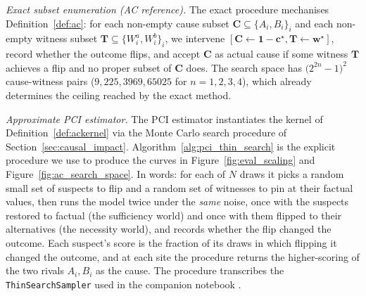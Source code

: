 \medskip\noindent\textit{Exact subset enumeration (AC reference).}
The exact procedure mechanises Definition~\ref{def:ac}: for each non-empty cause
subset $\mathbf{C}\subseteq\{A_i,B_i\}_i$ and each non-empty witness subset
$\mathbf{T}\subseteq\{W^a_i,W^b_i\}_i$, we intervene
$[\mathbf{C}\!\leftarrow\!\mathbf{1}-\mathbf{c}^\star,\mathbf{T}\!\leftarrow\!\mathbf{w}^\star]$,
record whether the outcome flips, and accept $\mathbf{C}$ as actual cause if some
witness $\mathbf{T}$ achieves a flip and no proper subset of $\mathbf{C}$ does.
The search space has $\bigl(2^{2n}-1\bigr)^2$ cause-witness pairs ($9, 225, 3969,
65025$ for $n=1,2,3,4$), which already determines the ceiling reached by the exact
method.

\medskip\noindent\textit{Approximate PCI estimator.}
The PCI estimator instantiates the kernel of Definition~\ref{def:ackernel}
via the Monte Carlo search procedure of Section~\ref{sec:causal_impact}. Algorithm~\ref{alg:pci_thin_search} is the
explicit procedure we use to produce the curves in
Figure~\ref{fig:eval_scaling} and Figure~\ref{fig:ac_search_space}.
In words: for each of $N$ draws it picks a random small set of suspects to flip and a
random set of witnesses to pin at their factual values, then runs the model twice under the
\emph{same} noise, once with the suspects restored to factual (the sufficiency world) and
once with them flipped to their alternatives (the necessity world), and records whether
the flip changed the outcome. Each suspect's score is the fraction of its draws in which
flipping it changed the outcome, and at each site the procedure returns the higher-scoring
of the two rivals $A_i, B_i$ as the cause. The procedure transcribes the \texttt{ThinSearchSampler}
used in the companion notebook .

